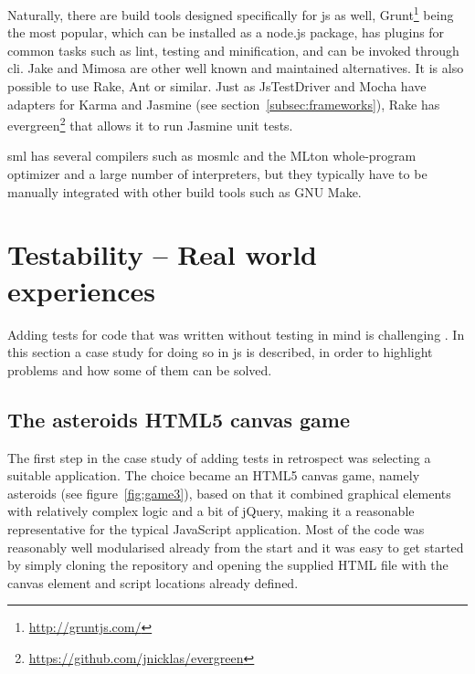 \documentclass[11pt]{article}
\begin{document}
Naturally, there are build tools designed specifically for \gls{js} as well, Grunt\footnote{\url{http://gruntjs.com/}} being the most popular, which can be installed as a node.js package, has plugins for common tasks such as lint, testing and minification, and can be invoked through \gls{cli}. \cite[question~52]{Edelstam} Jake and Mimosa are other well known and maintained alternatives. It is also possible to use Rake, Ant or similar. Just as JsTestDriver and Mocha have adapters for Karma and Jasmine (see section~\ref{subsec:frameworks}), Rake has evergreen\footnote{\url{https://github.com/jnicklas/evergreen}} that allows it to run Jasmine unit tests. \cite{BuildTools}\cite[question~6]{Ahnve}

\Gls{sml} has several compilers such as mosmlc and the MLton whole-program optimizer and a large number of interpreters, but they typically have to be manually integrated with other build tools such as GNU Make.


\section{Testability -- Real world experiences}
\label{sec:testability}

Adding tests for code that was written without testing in mind is challenging \cite[p.~18]{Tddjs}. In this section a case study for doing so in \gls{js} is described, in order to highlight problems and how some of them can be solved.

\subsection{The asteroids HTML5 canvas game}
\label{subsec:asteriods}

The first step in the case study of adding tests in retrospect was selecting a suitable application. The choice became an HTML5 canvas game, namely asteroids (see figure~\ref{fig:game3}), based on that it combined graphical elements with relatively complex logic and a bit of jQuery, making it a reasonable representative for the typical JavaScript application. Most of the code was reasonably well modularised already from the start and it was easy to get started by simply cloning the repository and opening the supplied HTML file with the canvas element and script locations already defined.
\end{document}
